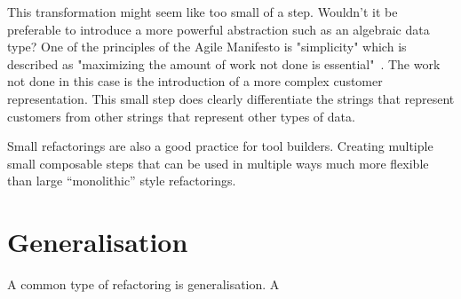  This transformation might seem like too small of a step. Wouldn't it be preferable to introduce a more powerful abstraction such as an algebraic data type? One of the principles of the Agile Manifesto is "simplicity" which is described as "maximizing the amount of work not done is essential"~\citep{agileManifesto}. The work not done in this case is the introduction of a more complex customer representation. This small step does clearly differentiate the strings that represent customers from other strings that represent other types of data.

Small refactorings are also a good practice for tool builders. Creating multiple small composable steps that can be used in multiple ways \DIFdelbegin {}\DIFdelend \DIFaddbegin {}\DIFaddend much more flexible than large ``monolithic'' style refactorings.


\DIFdelbegin %
\DIFdelend \DIFaddbegin \section{Generalisation}
\DIFaddend \label{genMaybe}

A common type of refactoring is generalisation. A \DIFdelbegin {}\DIFdelend \DIFaddbegin {}\texttt{} \texttt{}\texttt{} \texttt{} \DIFaddend 

